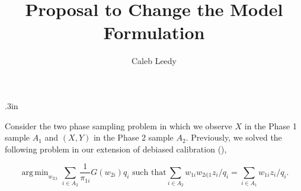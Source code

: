 \documentclass[12pt]{article}
\DeclareMathOperator*{\argmin}{arg\,min}
\begin{document}
\title{Proposal to Change the Model Formulation}
\author{Caleb Leedy}
\maketitle 

\baselineskip .3in

Consider the two phase sampling problem in which we observe $X$ in the Phase 1
sample $A_1$ and $(X, Y)$ in the Phase 2 sample $A_2$.
Previously, we solved the following problem in our extension of debiased
calibration (\cite{kwon2024debiased}),

\begin{equation}\label{eq:primal}
  \argmin_{w_{2|1}} \sum_{i \in A_2} \frac{1}{\pi_{1i}} G(w_{2i}) q_i 
  \text{ such that}
  \sum_{i \in A_2} w_{1i} w_{2i|1} z_i / q_i = \sum_{i \in A_1} w_{1i} z_i /
  q_i.
\end{equation}
\end{document}
